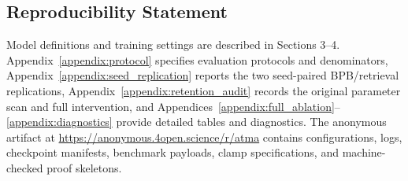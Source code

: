 \documentclass{article}
\begin{document}
\subsection*{Reproducibility Statement}
Model definitions and training settings are described in Sections 3--4. Appendix~\ref{appendix:protocol} specifies evaluation protocols and denominators, Appendix~\ref{appendix:seed_replication} reports the two seed-paired BPB/retrieval replications, Appendix~\ref{appendix:retention_audit} records the original parameter scan and full intervention, and Appendices~\ref{appendix:full_ablation}--\ref{appendix:diagnostics} provide detailed tables and diagnostics. The anonymous artifact at \url{https://anonymous.4open.science/r/atma} contains configurations, logs, checkpoint manifests, benchmark payloads, clamp specifications, and machine-checked proof skeletons.




\appendix

\end{document}

